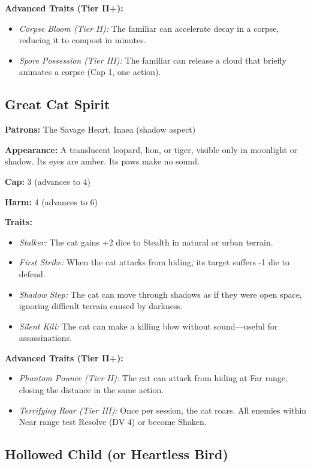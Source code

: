 \noindent\textbf{Advanced Traits (Tier II+):}
\begin{itemize}
\item \textit{Corpse Bloom (Tier II):} The familiar can accelerate decay in a corpse, reducing it to compost in minutes.
\item \textit{Spore Possession (Tier III):} The familiar can release a cloud that briefly animates a corpse (Cap 1, one action).
\end{itemize}

\subsection{Great Cat Spirit}

\noindent\textbf{Patrons:} The Savage Heart, Inaea (shadow aspect)

\noindent\textbf{Appearance:} A translucent leopard, lion, or tiger, visible only in moonlight or shadow. Its eyes are amber. Its paws make no sound.

\noindent\textbf{Cap:} 3 (advances to 4)

\noindent\textbf{Harm:} 4 (advances to 6)

\noindent\textbf{Traits:}

\begin{itemize}
\item \textit{Stalker:} The cat gains +2 dice to Stealth in natural or urban terrain.
\item \textit{First Strike:} When the cat attacks from hiding, its target suffers -1 die to defend.
\item \textit{Shadow Step:} The cat can move through shadows as if they were open space, ignoring difficult terrain caused by darkness.
\item \textit{Silent Kill:} The cat can make a killing blow without sound—useful for assassinations.
\end{itemize}

\noindent\textbf{Advanced Traits (Tier II+):}
\begin{itemize}
\item \textit{Phantom Pounce (Tier II):} The cat can attack from hiding at Far range, closing the distance in the same action.
\item \textit{Terrifying Roar (Tier III):} Once per session, the cat roars. All enemies within Near range test Resolve (DV 4) or become Shaken.
\end{itemize}

\subsection{Hollowed Child (or Heartless Bird)}

